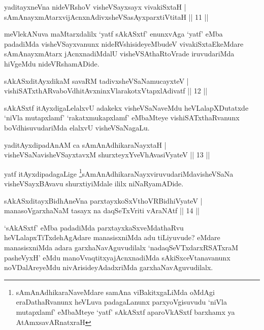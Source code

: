 
\begin{shl}
yaditayxneVna nideVRshoV visheVSayxsayx vivakiSxtaH |\\
sAmAnayxmAtarxvijAcnxnAdivxsheVSasAyxparxtiVtitaH \hfill || 11 ||
\end{shl}

\begin{artha}
meVlekANuva maMtarxdalilx `yatf sAkASxtf' enunxvAga `yatf' eMba padadiMda visheVSayxvanunx nideRVshisideyeMbudeV vivakiSxta\break EkeMdare sAmAnayxmAtarx jAcnxnadiMdalU visheVSAthaRtoVrade iruvudariMda hiVgeMdu nideVRshamADide.
\end{artha}

\begin{shl}
sAkASxditAyxdikaM savaRM tadivxsheVSaNamucayxteV |\\
vishiSATxthARvaboVdhitAvxninxVlarakotxVtapxlAdivatf \hfill || 12 ||
\end{shl}

\begin{artha}
sAkASxtf itAyxdigaLelalxvU adakekx visheVSaNaveMdu heVLalapXDutatxde `niVla mutapxlamf' `rakatxmukapxlamf' eMbaMteye vishiSATxthaRvanunx boVdhisuvudariMda elalxvU visheVSaNagaLu.
\end{artha}

\begin{shl}
yaditAyxdipadAnAM ca sAmAnAdhikaraNayxtaH |\\
visheVSaNavisheVSayxtavxM shurxteyxYveVhAvasiVyateV \hfill || 13 ||
\end{shl}

\begin{artha}
yatf itAyxdipadagaLige \footnote{sAmAnAdhikaraNaveMdare samAna viBakitxgaLiMda oMdAgi eraDathaRvanunx heVLuva padagaLanunx parxyoVgisuvudu `niVla mutapxlamf' eMbaMteye `yatf' sAkASxtf aparoVkASxtf barxhamx ya AtAmxsavARnatxraH}sAmAnAdhikaraNayxviruvudariMda\break visheVSaNa visheVSayxBAvavu shurxtiyiMdale ililx niNaRyamADide.
\end{artha}


\begin{shl}
sAkASxditayxBidhAneVna parxtayxkoSxV\s thoVR\s BidhiVyateV |\\
manasoV\s garxhaNaM tasayx na daqSeTxVriti vAraNAtf \hfill || 14 ||
\end{shl}

\begin{artha}
`sAkASxtf' eMba padadiMda parxtayxkaSxveMdathaRvu heVLalapxTiTxde\break hAgAdare manasisxniMda adu tiLiyuvude? eMdare manasisxniMda adara garxhaNavAguvudilalx `nadaqSeVTxdarxRSATxraM pasheVyxH' eMdu manoVvaqtitxyajAcnxnadiMda sAkiSxceVtanavanunx noVDalAreyeMdu nivArisideyAdadxriMda garxhaNavAguvudilalx.
\end{artha}

